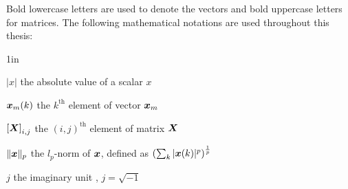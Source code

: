 \noindent Bold lowercase letters are used to denote the vectors and bold uppercase letters for matrices. The following mathematical notations are used throughout this thesis:
\begin{list}
{}
{\setlength
   {}{1in}
    \setlength{\leftmargin}{1.5in}
    \setlength{\labelsep}{.5in}}
	
	\item[$|x|$\hfill] the absolute value of a scalar $x$
	
	\item[$\boldsymbol{x}_m(k)$\hfill] the $k^\text{th}$ element of vector $\boldsymbol{x}_m$
	
	\item[${[}\boldsymbol{X}{]}_{i,j}$\hfill] the $(i,j)^\text{th}$ element of matrix $\boldsymbol{X}$

	\item[$\|\boldsymbol{x}\|_p$\hfill] the $l_p$-norm of $\boldsymbol{x}$, defined as $\left(\sum_k{|\boldsymbol{x}(k)|^p}\right)^{\frac{1}{p}}$
	
	\item[$j$\hfill] the imaginary unit \ie, $j=\sqrt{-1}$

\end{list}
